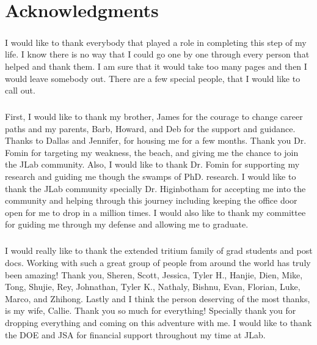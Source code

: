 \chapter*{Acknowledgments}

\paragraph{}I would like to thank everybody that played a role in completing this step of my life. I know there is no way that I could go one by one through every person that helped and thank them. I am sure that it would take too many pages and then I would leave somebody out. There are a few special people, that I would like to call out. 
\paragraph{}First, I would like to thank my brother, James for the courage to change career paths and my parents, Barb, Howard, and Deb for the support and guidance. Thanks to Dallas and Jennifer, for housing me for a few months. Thank you Dr. Fomin for targeting my weakness, the beach, and giving me the chance to join the JLab community. Also, I would like to thank Dr. Fomin for supporting my research and guiding me though the swamps of PhD. research. I would like to thank the JLab community specially Dr. Higinbotham for accepting me into the community and helping through this journey including keeping the office door open for me to drop in a million times. I would also like to thank my committee for guiding me through my defense and allowing me to graduate. 
\paragraph{}I would really like to thank the extended tritium family of grad students and post docs. Working with such a great group of people from around the world has truly been amazing! Thank you, Sheren, Scott, Jessica, Tyler H., Hanjie, Dien, Mike, Tong, Shujie, Rey, Johnathan, Tyler K., Nathaly, Bishnu, Evan, Florian, Luke, Marco, and Zhihong. Lastly and I think the person deserving of the most thanks, is my wife, Callie. Thank you so much for everything! Specially thank you for dropping everything and coming on this adventure with me.
I would like to thank the DOE and JSA for financial support throughout my time at JLab. 